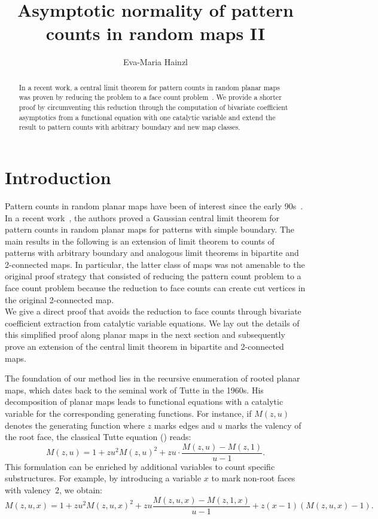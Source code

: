 \documentclass[reqno, 11pt]{amsart}
\title{Asymptotic normality of pattern counts in random maps II}
\author{Eva-Maria Hainzl}
\theoremstyle{definition}
\theoremstyle{remark}
\numberwithin{equation}{section}
\begin{document}
\maketitle 
\begin{abstract}
    In a recent work, a central limit theorem for pattern counts in random planar maps was proven by reducing the problem to a face count problem~\cite{patternocc}. We provide a shorter proof by circumventing this reduction through the computation of bivariate coefficient asymptotics from a functional equation with one catalytic variable and extend the result to pattern counts with arbitrary boundary and new map classes. 
\end{abstract}


\section{Introduction}

Pattern counts in random planar maps have been of interest since the early 90s~\cite{BenderGaoRichmond,GaoWormald,GaoWormald2,DrmotaStufler,Yu}. In a recent work~\cite{patternocc}, the authors proved a Gaussian central limit theorem for pattern counts in random planar maps for patterns with simple boundary. The main results in the following is an extension of limit theorem to counts of patterns with arbitrary boundary and analogous limit theorems in bipartite and 2-connected maps. In particular, the latter class of maps was not amenable to the original proof strategy that consisted of reducing the pattern count problem to a face count problem because the reduction to face counts can create cut vertices in the original 2-connected map.\\
We give a direct proof that avoids the reduction to face counts through bivariate coefficient extraction from catalytic variable equations.  
We lay out the details of this simplified proof along planar maps in the next section and subsequently prove an extension of the central limit theorem in bipartite and 2-connected maps.

The foundation of our method lies in the recursive enumeration of rooted planar maps, which dates back to the seminal work of Tutte in the 1960s. His decomposition of planar maps leads to functional equations with a catalytic variable for the corresponding generating functions. For instance, if $M(z, u)$ denotes the generating function where $z$ marks edges and $u$ marks the valency of the root face, the classical Tutte equation (\cite{tutte_1963}) reads:
\[
    M(z,u) = 1 + zu^2 M(z, u)^2 + zu \cdot \frac{M(z, u) - M(z, 1)}{u - 1}.
\]
This formulation can be enriched by additional variables to count specific substructures. For example, by introducing a variable $x$ to mark non-root faces with valency~$2$, we obtain:
\[
    M(z, u, x) = 1 + zu^2 M(z, u, x)^2 + zu  \frac{M(z, u, x) - M(z, 1, x)}{u - 1} + z(x-1)(M(z, u, x) - 1).
\]
\end{document}
